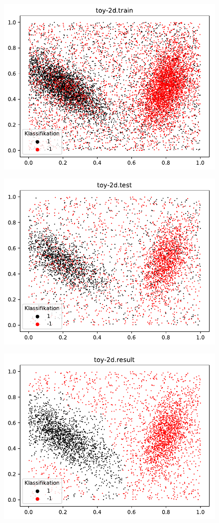 \documentclass{beamer}
\begin{document}
\begin{figure}[h]
\centering
\includegraphics[scale=0.7]{toy-2d-train.pdf}
\label{bananas}
\end{figure}

\begin{figure}[h]
\centering
\includegraphics[scale=0.7]{toy-2d-test.pdf}
\label{bananas}
\end{figure}

\begin{figure}[h]
\centering
\includegraphics[scale=0.7]{toy-2d-result.pdf}
\label{bananas}
\end{figure}
\end{document}
